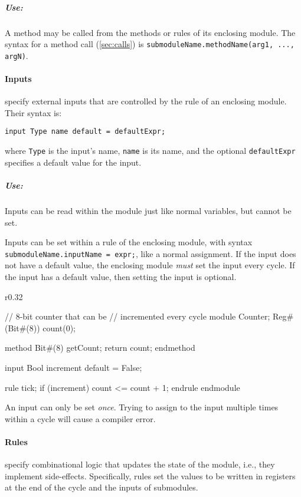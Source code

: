 \subparagraph{Use:}
A method may be called from the methods or rules of its enclosing module.
The syntax for a method call (\autoref{sec:calls}) is
\verb|submoduleName.methodName(arg1, ..., argN)|.



\paragraph{Inputs} specify external inputs that are controlled by
the rule of an enclosing module. Their syntax is:
\begin{center}
\verb|input Type name |\optStart\verb|default = defaultExpr|\optEnd\verb|;|
\end{center}
where \verb|Type| is the input's name,
\verb|name| is its name,
and the optional \verb|defaultExpr| specifies a default value for the input.

\subparagraph{Use:}
Inputs can be read within the module just like normal variables, but cannot be set.

Inputs can be set within a rule of the enclosing module,
with syntax \verb|submoduleName.inputName = expr;|,
like a normal assignment.
If the input does not have a default value,
the enclosing module \emph{must} set the input every cycle.
If the input has a default value, then setting the input is optional.

\begin{wrapfigure}{r}{0.32\columnwidth}
\vspace{-2em}
\begin{mscode}
// 8-bit counter that can be
// incremented every cycle
module Counter;
  Reg#(Bit#(8)) count(0);

  method Bit#(8) getCount;
    return count;
  endmethod

  input Bool increment
    default = False;

  rule tick;
    if (increment)
      count <= count + 1;
  endrule
endmodule
\end{mscode}
\vspace{-6em}
\end{wrapfigure}

An input can only be set \emph{once}. Trying to assign to the input multiple
times within a cycle will cause a compiler error.


\paragraph{Rules} specify combinational logic that updates the state of the module,
i.e., they implement side-effects.
Specifically, rules set the values to be written in registers
at the end of the cycle and the inputs of submodules.

